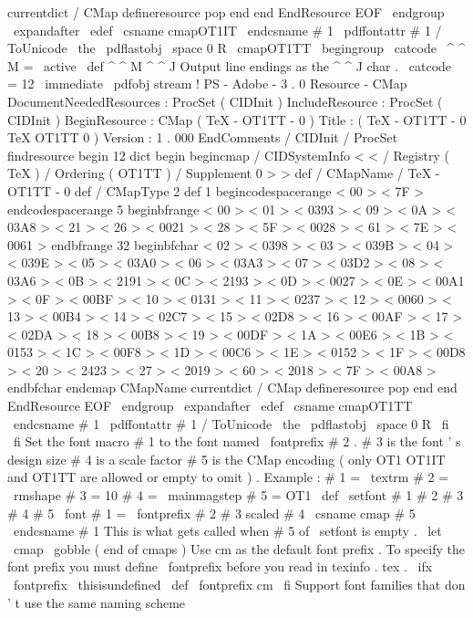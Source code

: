 {{{currentdict
/
CMap
defineresource
pop
end
end
%
%
EndResource
%
%
EOF
}
\
endgroup
\
expandafter
\
edef
\
csname
cmapOT1IT
\
endcsname
#
1
{
%
\
pdffontattr
#
1
{
/
ToUnicode
\
the
\
pdflastobj
\
space
0
R
}
%
}
%
%
%
\
cmapOT1TT
\
begingroup
\
catcode
\
^
^
M
=
\
active
\
def
^
^
M
{
^
^
J
}
%
Output
line
endings
as
the
^
^
J
char
.
\
catcode
\
%
=
12
\
immediate
\
pdfobj
stream
{
%
!
PS
-
Adobe
-
3
.
0
Resource
-
CMap
%
%
DocumentNeededResources
:
ProcSet
(
CIDInit
)
%
%
IncludeResource
:
ProcSet
(
CIDInit
)
%
%
BeginResource
:
CMap
(
TeX
-
OT1TT
-
0
)
%
%
Title
:
(
TeX
-
OT1TT
-
0
TeX
OT1TT
0
)
%
%
Version
:
1
.
000
%
%
EndComments
/
CIDInit
/
ProcSet
findresource
begin
12
dict
begin
begincmap
/
CIDSystemInfo
<
<
/
Registry
(
TeX
)
/
Ordering
(
OT1TT
)
/
Supplement
0
>
>
def
/
CMapName
/
TeX
-
OT1TT
-
0
def
/
CMapType
2
def
1
begincodespacerange
<
00
>
<
7F
>
endcodespacerange
5
beginbfrange
<
00
>
<
01
>
<
0393
>
<
09
>
<
0A
>
<
03A8
>
<
21
>
<
26
>
<
0021
>
<
28
>
<
5F
>
<
0028
>
<
61
>
<
7E
>
<
0061
>
endbfrange
32
beginbfchar
<
02
>
<
0398
>
<
03
>
<
039B
>
<
04
>
<
039E
>
<
05
>
<
03A0
>
<
06
>
<
03A3
>
<
07
>
<
03D2
>
<
08
>
<
03A6
>
<
0B
>
<
2191
>
<
0C
>
<
2193
>
<
0D
>
<
0027
>
<
0E
>
<
00A1
>
<
0F
>
<
00BF
>
<
10
>
<
0131
>
<
11
>
<
0237
>
<
12
>
<
0060
>
<
13
>
<
00B4
>
<
14
>
<
02C7
>
<
15
>
<
02D8
>
<
16
>
<
00AF
>
<
17
>
<
02DA
>
<
18
>
<
00B8
>
<
19
>
<
00DF
>
<
1A
>
<
00E6
>
<
1B
>
<
0153
>
<
1C
>
<
00F8
>
<
1D
>
<
00C6
>
<
1E
>
<
0152
>
<
1F
>
<
00D8
>
<
20
>
<
2423
>
<
27
>
<
2019
>
<
60
>
<
2018
>
<
7F
>
<
00A8
>
endbfchar
endcmap
CMapName
currentdict
/
CMap
defineresource
pop
end
end
%
%
EndResource
%
%
EOF
}
\
endgroup
\
expandafter
\
edef
\
csname
cmapOT1TT
\
endcsname
#
1
{
%
\
pdffontattr
#
1
{
/
ToUnicode
\
the
\
pdflastobj
\
space
0
R
}
%
}
%
\
fi
\
fi
%
Set
the
font
macro
#
1
to
the
font
named
\
fontprefix
#
2
.
%
#
3
is
the
font
'
s
design
size
#
4
is
a
scale
factor
#
5
is
the
CMap
%
encoding
(
only
OT1
OT1IT
and
OT1TT
are
allowed
or
empty
to
omit
)
.
%
Example
:
%
#
1
=
\
textrm
%
#
2
=
\
rmshape
%
#
3
=
10
%
#
4
=
\
mainmagstep
%
#
5
=
OT1
%
\
def
\
setfont
#
1
#
2
#
3
#
4
#
5
{
%
\
font
#
1
=
\
fontprefix
#
2
#
3
scaled
#
4
\
csname
cmap
#
5
\
endcsname
#
1
%
}
%
This
is
what
gets
called
when
#
5
of
\
setfont
is
empty
.
\
let
\
cmap
\
gobble
%
%
(
end
of
cmaps
)
%
Use
cm
as
the
default
font
prefix
.
%
To
specify
the
font
prefix
you
must
define
\
fontprefix
%
before
you
read
in
texinfo
.
tex
.
\
ifx
\
fontprefix
\
thisisundefined
\
def
\
fontprefix
{
cm
}
\
fi
%
Support
font
families
that
don
'
t
use
the
same
naming
scheme
}}
